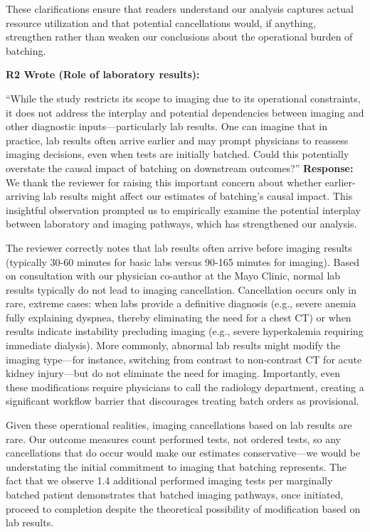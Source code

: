 \documentclass[11pt]{article}
\newenvironment{quote2}
{ \bigskip
\noindent
         \small\em
         \baselineskip=14pt
}
\newcommand{\1}{\hbox{\rm 1\kern-.35em 1}}
\begin{document}
{These clarifications ensure that readers understand our analysis captures actual resource utilization and that potential cancellations would, if anything, strengthen rather than weaken our conclusions about the operational burden of batching.

\color{black}

\begin{quote2}
\textbf{R2 Wrote (Role of laboratory results):}  

\noindent``While the study restricts its scope to imaging due to its operational constraints, it does not address the interplay and potential dependencies between imaging and other diagnostic inputs—particularly lab results. One can imagine that in practice, lab results often arrive earlier and may prompt physicians to reassess imaging decisions, even when tests are initially batched. Could this potentially overstate the causal impact of batching on downstream outcomes?” 
\end{quote2}

\noindent\textbf{Response:} \color{blue}
We thank the reviewer for raising this important concern about whether earlier-arriving lab results might affect our estimates of batching's causal impact. This insightful observation prompted us to empirically examine the potential interplay between laboratory and imaging pathways, which has strengthened our analysis.

The reviewer correctly notes that lab results often arrive before imaging results (typically 30-60 minutes for basic labs versus 90-165 minutes for imaging). Based on consultation with our physician co-author at the Mayo Clinic, normal lab results typically do not lead to imaging cancellation. Cancellation occurs only in rare, extreme cases: when labs provide a definitive diagnosis (e.g., severe anemia fully explaining dyspnea, thereby eliminating the need for a chest CT) or when results indicate instability precluding imaging (e.g., severe hyperkalemia requiring immediate dialysis). More commonly, abnormal lab results might modify the imaging type—for instance, switching from contrast to non-contrast CT for acute kidney injury—but do not eliminate the need for imaging. Importantly, even these modifications require physicians to call the radiology department, creating a significant workflow barrier that discourages treating batch orders as provisional.

Given these operational realities, imaging cancellations based on lab results are rare.  Our outcome measures count performed tests, not ordered tests, so any cancellations  that do occur would make our estimates conservative—we would be understating the  initial commitment to imaging that batching represents. The fact that we observe 1.4  additional performed imaging tests per marginally batched patient demonstrates that  batched imaging pathways, once initiated, proceed to completion despite the theoretical possibility of modification based on lab results.

}
\end{document}
